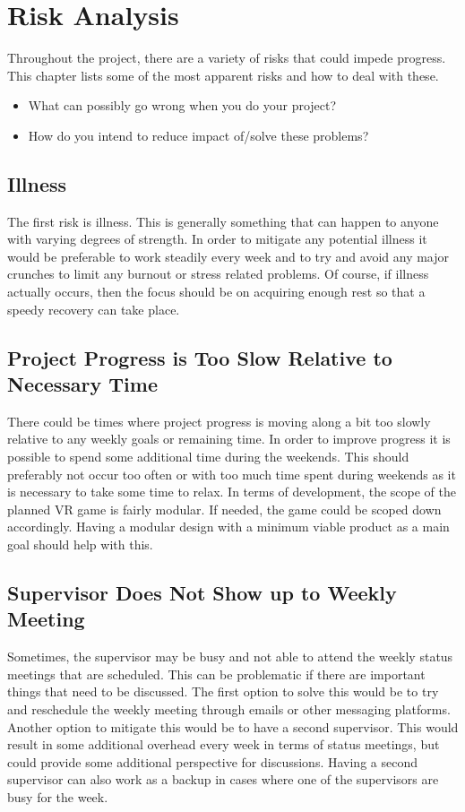 \chapter{Risk Analysis}\label{chap:risk}
Throughout the project, there are a variety of risks that could impede progress. This chapter lists some of the most apparent risks and how to deal with these.

\begin{itemize}
\item What can possibly go wrong when you do your project?
\item How do you intend to reduce impact of/solve these problems?
\end{itemize}
\fi

\section{Illness}
The first risk is illness. This is generally something that can happen to anyone with varying degrees of strength. In order to mitigate any potential illness it would be preferable to work steadily every week and to try and avoid any major crunches to limit any burnout or stress related problems. Of course, if illness actually occurs, then the focus should be on acquiring enough rest so that a speedy recovery can take place. 

\section{Project Progress is Too Slow Relative to Necessary Time}
There could be times where project progress is moving along a bit too slowly relative to any weekly goals or remaining time. In order to improve progress it is possible to spend some additional time during the weekends. This should preferably not occur too often or with too much time spent during weekends as it is necessary to take some time to relax. In terms of development, the scope of the planned VR game is fairly modular. If needed, the game could be scoped down accordingly. Having a modular design with a minimum viable product as a main goal should help with this. 

\section{Supervisor Does Not Show up to Weekly Meeting}
Sometimes, the supervisor may be busy and not able to attend the weekly status meetings that are scheduled. This can be problematic if there are important things that need to be discussed. The first option to solve this would be to try and reschedule the weekly meeting through emails or other messaging platforms. Another option to mitigate this would be to have a second supervisor. This would result in some additional overhead every week in terms of status meetings, but could provide some additional perspective for discussions. Having a second supervisor can also work as a backup in cases where one of the supervisors are busy for the week. 

